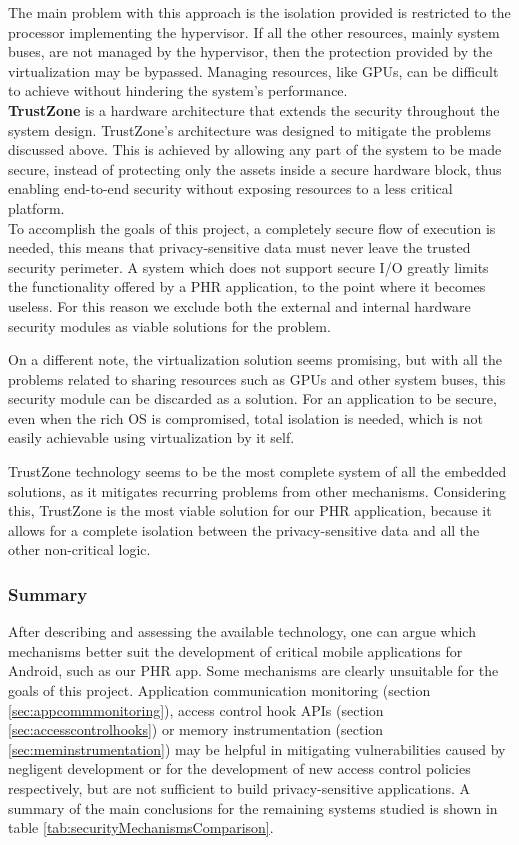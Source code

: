 The main problem with this approach is the isolation provided is restricted to the processor implementing the hypervisor. If all the other resources, mainly system buses, are not managed by the hypervisor, then the protection provided by the virtualization may be bypassed. Managing resources, like \ac{GPUs}, can be difficult to achieve without hindering the system's performance.\\

\textbf{TrustZone} is a hardware architecture that extends the security throughout the system design. TrustZone's architecture was designed to mitigate the problems discussed above. This is achieved by allowing any part of the system to be made secure, instead of protecting only the assets inside a secure hardware block, thus enabling end-to-end security without exposing resources to a less critical platform.\\

To accomplish the goals of this project, a completely secure flow of execution is needed, this means that privacy-sensitive data must never leave the trusted security perimeter. A system which does not support secure I/O greatly limits the functionality offered by a \ac{PHR} application, to the point where it becomes useless. For this reason we exclude both the external and internal hardware security modules as viable solutions for the problem.

On a different note, the virtualization solution seems promising, but with all the problems related to sharing resources such as \ac{GPUs} and other system buses, this security module can be discarded as a solution. For an application to be secure, even when the rich OS is compromised, total isolation is needed, which is not easily achievable using virtualization by it self.

TrustZone technology seems to be the most complete system of all the embedded solutions, as it mitigates recurring problems from other mechanisms. Considering this, TrustZone is the most viable solution for our \ac{PHR} application, because it allows for a complete isolation between the privacy-sensitive data and all the other non-critical logic. 

\subsubsection{Summary}

After describing and assessing the available technology, one can argue which mechanisms better suit the development of critical mobile applications for Android, such as our \ac{PHR} app. Some mechanisms are clearly unsuitable for the goals of this project. Application communication monitoring (section \ref{sec:appcommmonitoring}), access control hook APIs (section \ref{sec:accesscontrolhooks}) or memory instrumentation (section \ref{sec:meminstrumentation}) may be helpful in mitigating vulnerabilities caused by negligent development or for the development of new access control policies respectively, but are not sufficient to build privacy-sensitive applications. A summary of the main conclusions for the remaining systems studied is shown in table \ref{tab:securityMechanismsComparison}.

